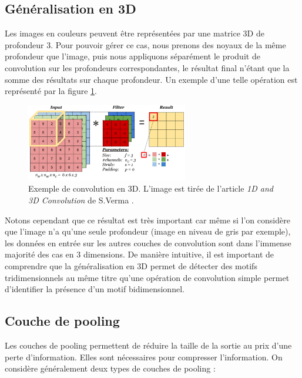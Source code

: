 \subsection{Généralisation en 3D}

Les images en couleurs peuvent être représentées par une matrice 3D de profondeur 3. Pour pouvoir gérer ce cas, nous prenons des noyaux de la même profondeur que l'image, puis nous appliquons séparément le produit de convolution sur les profondeurs correspondantes, le résultat final n'étant que la somme des résultats sur chaque profondeur. Un exemple d'une telle opération est représenté par la figure \ref{CNN_3D}.

\begin{figure}[!h]
\centering
\includegraphics[width=200pt]{images/cnn/CNN_3D.png}
\caption{Exemple de convolution en 3D. L'image est tirée de l'article \textit{1D and 3D Convolution} de S.Verma \cite{verma_understanding_2020}.}
\label{CNN_3D}
\end{figure}

Notons cependant que ce résultat est très important car même si l'on considère que l'image n'a qu'une seule profondeur (image en niveau de gris par exemple), les données en entrée sur les autres couches de convolution sont dans l'immense majorité des cas en 3 dimensions. De manière intuitive, il est important de comprendre que la généralisation en 3D permet de détecter des motifs tridimensionnels au même titre qu'une opération de convolution simple permet d'identifier la présence d'un motif bidimensionnel. 

\subsection{Couche de pooling}

Les couches de pooling permettent de réduire la taille de la sortie au prix d'une perte d'information. Elles sont nécessaires pour compresser l'information. On considère généralement deux types de couches de pooling :

